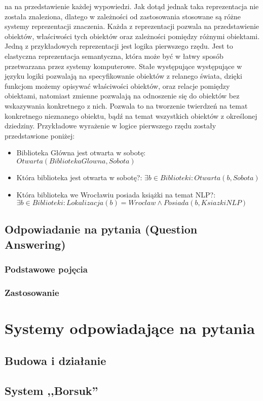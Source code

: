 \documentclass[a4paper, twoside, 12pt]{report}
\begin{document}
            na na przedstawienie każdej wypowiedzi. Jak dotąd jednak taka reprezentacja nie została znaleziona, dlatego
            w zależności od zastosowania stosowane są różne systemy reprezentacji znaczenia. Każda z reprezentacji
            pozwala na przedstawienie obiektów, właściwości tych obiektów oraz zależności pomiędzy różnymi obiektami.
            Jedną z przykładowych reprezentacji jest logika pierwszego rzędu. Jest to elastyczna reprezentacja semantyczna,
            która może być w łatwy sposób przetwarzana przez systemy komputerowe. Stałe występujące występujące w języku
            logiki pozwalają na specyfikowanie obiektów z relanego świata, dzięki funkcjom możemy opisywać właściwości
            obiektów, oraz relacje pomiędzy obiektami, natomiast zmienne pozwalają na odnoszenie się do obiektów bez wskazywania
            konkretnego z nich. Pozwala to na tworzenie twierdzeń na temat konkretnego nieznanego obiektu, bądź na temat
            wszystkich obiektów z określonej dziedziny. Przykładowe wyrażenie w logice pierwszego rzędu zostały przedstawione
            poniżej:
            \begin{itemize}
                \item Biblioteka Główna jest otwarta w sobotę: $ Otwarta(BibliotekaGlowna, Sobota) $
                \item Która biblioteka jest otwarta w sobotę?: $ \exists b \in Biblioteki: Otwarta(b, Sobota) $
                \item Która biblioteka we Wrocławiu posiada książki na temat NLP?: \\ $ \exists b \in Biblioteki: Lokalizacja(b) = Wroclaw \land Posiada(b, KsiazkiNLP) $
            \end {itemize}


    \section{Odpowiadanie na pytania (Question Answering)}
        \subsection{Podstawowe pojęcia}
        \subsection{Zastosowanie}
\chapter{Systemy odpowiadające na pytania}
    \section{Budowa i działanie}
    \section{System ,,Borsuk''}

\clearpage
{}


\end{document}
